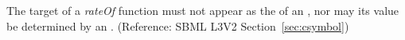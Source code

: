 The target of a \emph{rateOf}  function must not appear as the  of an \AssignmentRule, nor may its value be determined by an \AlgebraicRule.  (Reference: SBML L3V2 Section~\ref{sec:csymbol})

